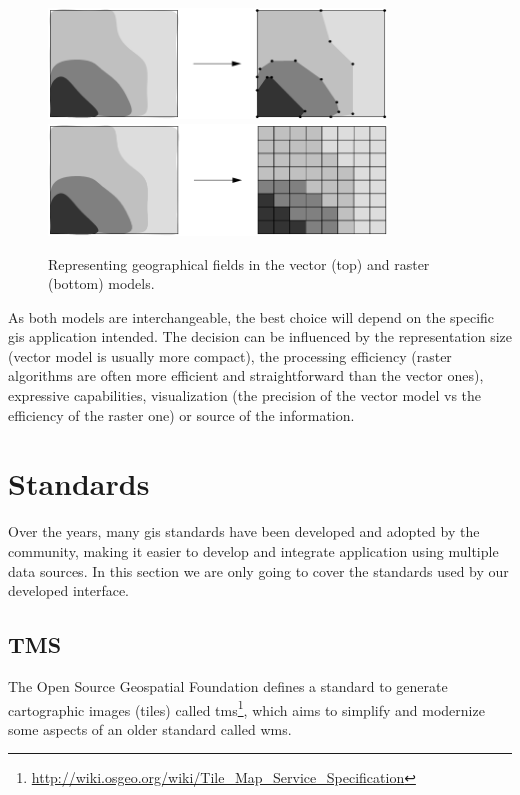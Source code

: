     \begin{figure}[ht]
		\begin{center}
			{\includegraphics[width=0.8\textwidth]{figures/field_vector.png}}
			{\includegraphics[width=0.8\textwidth]{figures/field_raster.png}}
		\end{center}
		\caption{Representing geographical fields in the vector (top) and raster (bottom) models.}
		\label{fig:gis:field}
	\end{figure}
    
    As both models are interchangeable, the best choice will depend on the specific \gls{gis} application intended. The decision can be influenced by the representation size (vector model is usually more compact), the processing efficiency (raster algorithms are often more efficient and straightforward than the vector ones), expressive capabilities, visualization (the precision of the vector model vs the efficiency of the raster one) or source of the information.
    
    \section{Standards}
    \label{sec:gis:std}
    Over the years, many \gls{gis} standards have been developed and adopted by the community, making it easier to develop and integrate application using multiple data sources. In this section we are only going to cover the standards used by our developed interface.
    
    \subsection{TMS}
    The Open Source Geospatial Foundation defines a standard to generate cartographic images (tiles) called \gls{tms}\footnote{\url{http://wiki.osgeo.org/wiki/Tile_Map_Service_Specification}}, which aims to simplify and modernize some aspects of an older standard called \gls{wms}.
    
